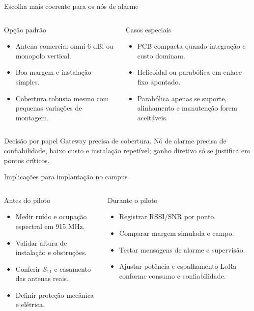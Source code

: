 \documentclass[aspectratio=169]{beamer}
\begin{document}
\begin{frame}{Escolha mais coerente para os nós de alarme}
\small
\begin{columns}[T,onlytextwidth]
\begin{block}{Opção padrão}
\begin{itemize}
  \item Antena comercial omni 6 dBi ou monopolo vertical.
  \item Boa margem e instalação simples.
  \item Cobertura robusta mesmo com pequenas variações de montagem.
\end{itemize}
\end{block}
\begin{block}{Casos especiais}
\begin{itemize}
  \item PCB compacta quando integração e custo dominam.
  \item Helicoidal ou parabólica em enlace fixo apontado.
  \item Parabólica apenas se suporte, alinhamento e manutenção forem aceitáveis.
\end{itemize}
\end{block}
\end{columns}
\begin{block}{Decisão por papel}
Gateway precisa de cobertura. Nó de alarme precisa de confiabilidade, baixo custo e instalação repetível; ganho diretivo só se justifica em pontos críticos.
\end{block}
\end{frame}

\begin{frame}{Implicações para implantação no campus}
\small
\begin{columns}[T,onlytextwidth]
\begin{block}{Antes do piloto}
\begin{itemize}
  \item Medir ruído e ocupação espectral em 915 MHz.
  \item Validar altura de instalação e obstruções.
  \item Conferir $S_{11}$ e casamento das antenas reais.
  \item Definir proteção mecânica e elétrica.
\end{itemize}
\end{block}
\begin{block}{Durante o piloto}
\begin{itemize}
  \item Registrar RSSI/SNR por ponto.
  \item Comparar margem simulada e campo.
  \item Testar mensagens de alarme e supervisão.
  \item Ajustar potência e espalhamento LoRa conforme consumo e confiabilidade.
\end{itemize}
\end{block}
\end{columns}
\end{frame}
\end{document}
